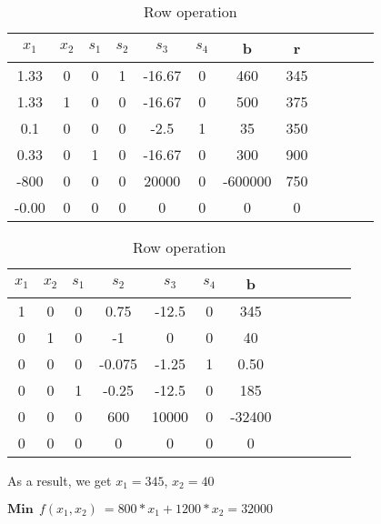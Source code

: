 \documentclass{article}
\begin{document}
  \begin{table}[H]
  \centering
  \caption{Row operation}
  \begin{tabular}{|c|c|c|c|c|c|c|c|c|c|c|c|}
  \hline
  $x_1$ & $x_2$ & $s_1$  & $s_2$ & $s_3$ & $s_4$ & b & r  \\ \hline
  1.33    & 0      & 0       & 1       & -16.67    & 0    & 460  & \cellcolor{yellow}345\\ \hline
  1.33    & 1      & 0       & 0       & -16.67    & 0    & 500  & 375\\ \hline
  0.1     & 0      & 0       & 0       & -2.5      & 1     & 35      & 350\\ \hline
  0.33    & 0      & 1       & 0       & -16.67    & 0    & 300  & 900\\ \hline
  -800    & 0      & 0       & 0       & 20000    & 0    & -600000 & 750\\ \hline
  \cellcolor{green}-0.00   & 0      & 0       & 0       & 0    & 0    & 0     & 0\\ \hline
  \end{tabular}
  \end{table}

  \begin{table}[H]
  \centering
  \caption{Row operation}
  \begin{tabular}{|c|c|c|c|c|c|c|c|c|c|c|c|}
  \hline
  $x_1$ & $x_2$ & $s_1$  & $s_2$ & $s_3$ & $s_4$ & b \\ \hline
  1    & 0      & 0       & 0.75   & -12.5  & 0    & \cellcolor{red}345 \\ \hline
  0    & 1      & 0       & -1     & 0      & 0    & \cellcolor{red}40  \\ \hline
  0    & 0      & 0       & -0.075 & -1.25  & 1    & 0.50  \\ \hline
  0    & 0      & 1       & -0.25  & -12.5  & 0    & 185  \\ \hline
  0    & 0      & 0       & 600    & 10000  & 0    & -32400 \\ \hline
  0    & 0      & 0       & 0      & 0      & 0     & 0     \\ \hline
  \end{tabular}
  \end{table}

  As a result, we get $x_1=345$, $x_2=40$

  $\textbf{Min}\:\: f(x_1,x_2) \: = 800*x_1 + 1200*x_2 = 32000$
\end{document}
